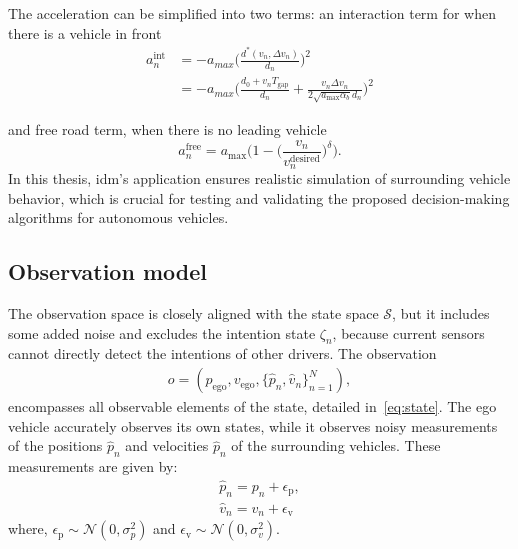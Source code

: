 The acceleration can be simplified into two terms: an interaction term for when there is a vehicle in front 
\begin{align}
     a^\text{int}_n &=  -a_{max} \Big(\frac{d^*(v_n,\Delta v_n)}{d_n} \Big) ^2  \nonumber \\
     &= -a_{max} \Big(\frac{d_0 + v_n T_{\mathrm{gap}}}{d_n} + \frac{v_n \Delta v_n}{2 \sqrt{a_{\mathrm{max}} \alpha_b} d_n} \Big) ^2
     \label{eq:idm_int}
\end{align}

and free road term, when there is no leading vehicle
\begin{equation}
    a^\text{free}_n= a_\mathrm{max}\Big(1-\Big(\frac{v_n}{v^\mathrm{desired}_n}\Big)^\delta\Big).
    \label{eq:idm_free}
\end{equation}
In this thesis, \gls{idm}'s application ensures realistic simulation of surrounding vehicle behavior, which is crucial for testing and validating the proposed decision-making algorithms for autonomous vehicles.

\subsection{Observation model}
The observation space is closely aligned with the state space $\mathcal{S}$, but it includes some added noise and excludes the intention state $\zeta_n$, because current sensors cannot directly detect the intentions of other drivers.
The observation
\begin{align}
	o = (p_\mathrm{ego}, v_\mathrm{ego}, \{\hat{p}_{n}, \hat{v}_n\}_{n=1}^N), 
	\label{eq:thesis_observation}
\end{align}
encompasses all observable elements of the state, detailed in~\eqref{eq:state}. 
The ego vehicle accurately observes its own states, while it observes noisy measurements of the positions $\hat{p}_{n}$ and velocities $\hat{p}_{n}$ of the surrounding vehicles. These measurements are given by:
\begin{align}
    \label{eq:thesis_noise_pos}
    \hat{p}_{n} = p_{n} + \epsilon_\mathrm{p},\\ 
    \hat{v}_n = v_n + \epsilon_\mathrm{v}
    \label{eq:thsis_noise_vel}
\end{align}
where, $\epsilon_\mathrm{p} \sim \mathcal{N}(0, \sigma^2_p)$ and $\epsilon_\mathrm{v} \sim \mathcal{N}(0, \sigma^2_v)$. 


